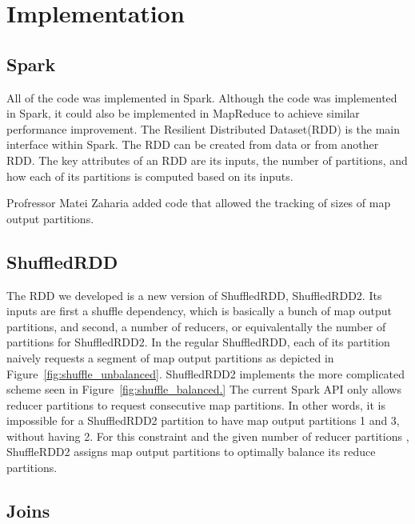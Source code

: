\chapter{Implementation}\label{intro-ch}

\section{Spark}

All of the code was implemented in Spark. Although the code was implemented in Spark, 
it could also be implemented in MapReduce to achieve similar performance improvement.
The  Resilient Distributed Dataset(RDD) is the main interface within Spark.
The RDD can be created from data or from another RDD. The key attributes of an RDD are its inputs,
the number of partitions, and how each of its partitions is computed based on its inputs.

Profressor Matei Zaharia added code that allowed the tracking of sizes of map output partitions.   

\section{ShuffledRDD}

The RDD we developed is a new version of ShuffledRDD, ShuffledRDD2. 
Its inputs are first a shuffle dependency, which is basically a bunch of map output partitions, and second, a number of reducers, or equivalentally the 
number of partitions for ShuffledRDD2. 
In the regular ShuffledRDD, each of its partition naively requests a segment of map output partitions as depicted in Figure~\ref{fig:shuffle_unbalanced}.
ShuffledRDD2 implements the more complicated scheme seen in Figure~\ref{fig:shuffle_balanced.} 
The current Spark API only allows reducer partitions to request consecutive map partitions. In other words, it is impossible for a ShuffledRDD2 partition to have map output partitions 1 and 3, without having 2. For this constraint and the given number of reducer partitions , ShuffleRDD2 assigns map output partitions to optimally balance its reduce partitions. 

\section{Joins}

